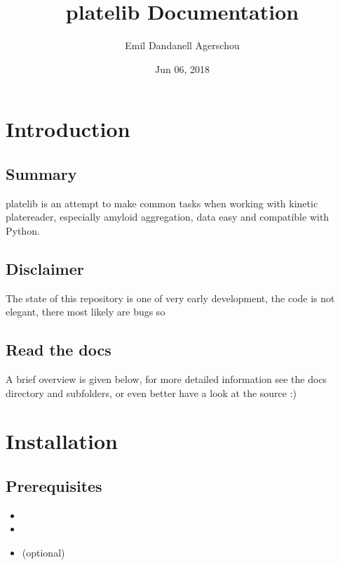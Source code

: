 \documentclass[letterpaper,10pt,english]{sphinxmanual}
\title{platelib Documentation}
\date{Jun 06, 2018}
\author{Emil Dandanell Agerschou}
\begin{document}
\maketitle
\sphinxtableofcontents
{}\label{\detokenize{index::doc}}



\chapter{Introduction}
\label{\detokenize{introduction:introduction}}\label{\detokenize{introduction::doc}}\label{\detokenize{introduction:welcome-to-the-platelib-documentation}}

\section{Summary}
\label{\detokenize{introduction:summary}}
platelib is an attempt to make common tasks when working
with kinetic platereader, especially amyloid aggregation,
data easy and compatible with Python.


\section{Disclaimer}
\label{\detokenize{introduction:disclaimer}}
The state of this repository is one of very early development,
the code is not elegant, there most likely are bugs so


\section{Read the docs}
\label{\detokenize{introduction:read-the-docs}}
A brief overview is given below, for more detailed information
see the docs directory and subfolders,
or even better have a look at the source :)


\chapter{Installation}
\label{\detokenize{install:installation}}\label{\detokenize{install::doc}}

\section{Prerequisites}
\label{\detokenize{install:prerequisites}}\begin{itemize}
\item {} 

\item {} 

\item {} 
 (optional)

\end{itemize}
\end{document}
